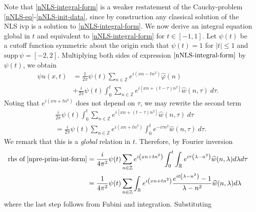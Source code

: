\documentclass[12pt,reqno]{amsart}
\numberwithin{equation}{section}  %
\newcommand{\rr}{\mathbb{R}}
\newcommand{\zz}{\mathbb{Z}}
\newcommand{\wh}{\widehat}
\newcommand{\vp}{\varphi}
\begin{document}
%
%
Note that \eqref{nNLS-integral-form} is a weaker 
restatement of the Cauchy-problem \eqref{nNLS-eq}-\eqref{nNLS-init-data}, 
since by construction any classical solution of the NLS 
ivp is a solution to \eqref{nNLS-integral-form}. 
%
%
We now derive an integral 
equation global in $t$ and equivalent to \eqref{nNLS-integral-form} for $t 
\in [-1, 1]$. Let $\psi(t)$ be a cutoff function symmetric about the 
origin such that $\psi(t) = 1$ for $|t| \le 1$ and $\text{supp} \, \psi 
= [-2, 2 ]$. Multiplying both sides of expression
$\eqref{nNLS-integral-form}$ by $\psi(t)$, we obtain
%
%
\begin{equation}
	\begin{split}
		\label{ncutoff-int-eq}
    \psi u(x, t)
		& = \frac{1}{2 \pi} \psi(t) \sum_{n \in \zz} e^{i(xn - t n^{2})} \widehat{\vp}(n) 
		\\
		& + \frac{i }{2 \pi} \psi(t) \int_0^t \sum_{n \in \zz} 
		e^{i\left[ xn + (t - \tau)n^2 \right]} \wh{w}(n, \tau) \ d\tau.
	\end{split}
\end{equation}
%
%
Noting that $e^{i\left( xn + tn^{2} \right)}$ 
does not depend on $\tau$, we may rewrite the second term
%
%
\begin{equation}
	\label{npre-prim-int-form}
	\begin{split}
		& \frac{i }{2 \pi} \psi(t) \int_0^t \sum_{n \in \zz} 
		e^{i\left[ xn + (t - \tau) n^2 \right]} \wh{w}(n, \tau) \ d\tau
		\\
		& = \frac{i}{2 \pi} \psi(t) \sum_{n \in \zz} e^{i\left( xn + t 
		 n^{2} 
		\right)} \int_0^t e^{- i\tau n^{2}} \wh{w}(n, \tau) \ d\tau.
	\end{split}
\end{equation}
We remark that this is a \emph{global} relation in $t$. Therefore, by Fourier 
inversion
%
%
%
%
%
%
%
\begin{equation*}
	\begin{split}
		\text{rhs of} \; \eqref{npre-prim-int-form}
		& = \frac{i}{4 \pi^2} \psi (t) \sum_{n \in \zz} e^{i\left( xn + t 
		 n^2
		\right)} \int_0^t \int_\rr e^{i\tau\left( \lambda - n^2 \right) }
		\wh{w}(n, \lambda) d \lambda d\tau
		\\
		& = \frac{1}{4 \pi^2} \psi(t) \sum_{n \in \zz} \int_\rr 
		e^{i\left( xn + tn^2 \right)} \frac{e^{it\left( \lambda - n^2 
		\right)}-1}{\lambda - n^2} \wh{w}(n, \lambda) d \lambda
	\end{split}
\end{equation*}
%
%
where the last step follows from Fubini and integration. Substituting
\end{document}
